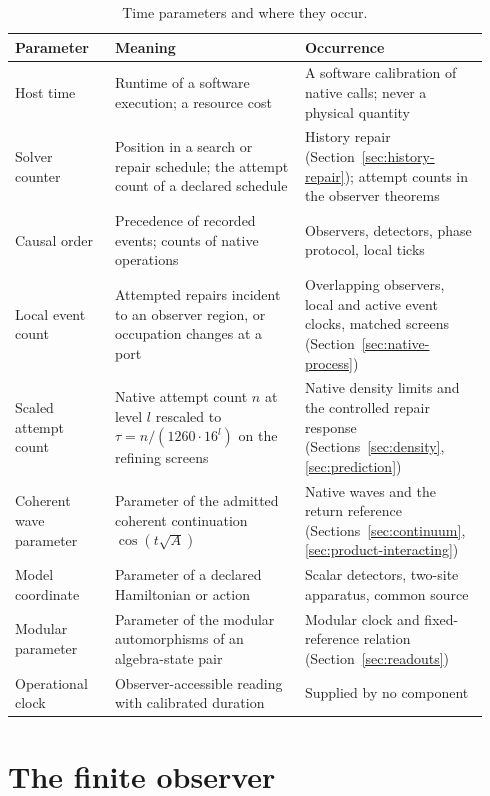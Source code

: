 \documentclass[11pt]{article}
\theoremstyle{definition}
\theoremstyle{remark}
\theoremstyle{plain}
\begin{document}
\begin{table}[htbp]
\centering
\small
\caption{Time parameters and where they occur.}
\label{tab:time}
\begin{tabular}{@{}L{0.20\linewidth}L{0.38\linewidth}L{0.36\linewidth}@{}}
\toprule
\textbf{Parameter} & \textbf{Meaning} & \textbf{Occurrence}\\
\midrule
Host time & Runtime of a software execution; a resource cost & A software calibration of native calls; never a physical quantity\\
Solver counter & Position in a search or repair schedule; the attempt count of a declared schedule & History repair (Section~\ref{sec:history-repair}); attempt counts in the observer theorems\\
Causal order & Precedence of recorded events; counts of native operations & Observers, detectors, phase protocol, local ticks\\
Local event count & Attempted repairs incident to an observer region, or occupation changes at a port & Overlapping observers, local and active event clocks, matched screens (Section~\ref{sec:native-process})\\
Scaled attempt count & Native attempt count $n$ at level $l$ rescaled to $\tau=n/(1260\cdot16^l)$ on the refining screens & Native density limits and the controlled repair response (Sections~\ref{sec:density}, \ref{sec:prediction})\\
Coherent wave parameter & Parameter of the admitted coherent continuation $\cos(t\sqrt A)$ & Native waves and the return reference (Sections~\ref{sec:continuum}, \ref{sec:product-interacting})\\
Model coordinate & Parameter of a declared Hamiltonian or action & Scalar detectors, two-site apparatus, common source\\
Modular parameter & Parameter of the modular automorphisms of an algebra-state pair & Modular clock and fixed-reference relation (Section~\ref{sec:readouts})\\
Operational clock & Observer-accessible reading with calibrated duration & Supplied by no component\\
\bottomrule
\end{tabular}
\end{table}

\section{The finite observer}
\label{sec:observer}
\end{document}
